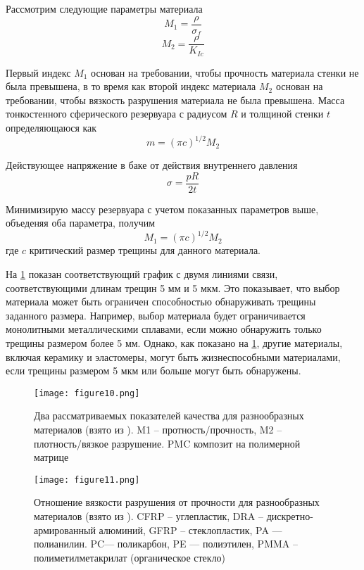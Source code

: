 Рассмотрим следующие параметры материала 
\[ M_1 = \frac{\rho}{\sigma_f} \]
\[ M_2 = \frac{\rho}{K_{Ic}} \]

Первый индекс \(M_1\) основан на требовании, чтобы прочность материала стенки не была превышена, в то время как второй индекс материала \(M_2\) основан на требовании, чтобы вязкость разрушения материала не была превышена. Масса тонкостенного сферического резервуара с радиусом \(R\) и толщиной стенки \(t\) определяющаюся как
\[ m = \left (\pi c \right)^{1/2} M_2 \]

Действующее напряжение в баке от действия внутреннего давления
\[ \sigma = \frac{p R}{2 t}\]

Минимизирую массу резервуара с учетом показанных параметров выше, объеденяя оба параметра, получим
\[ M_1 = \left ( \pi c \right ) ^{1/2} M_2\]
где \(c\) критический размер трещины для данного материала.

На \cref{fig:figure10} показан соответствующий график с двумя линиями связи, соответствующими длинам трещин 5 мм и 5 мкм. Это показывает, что выбор материала может быть ограничен способностью обнаруживать трещины заданного размера. Например, выбор материала будет ограничивается монолитными металлическими сплавами, если можно обнаружить только трещины размером более 5 мм. Однако, как показано на \cref{fig:figure10}, другие материалы, включая керамику и эластомеры, могут быть жизнеспособными материалами, если трещины размером 5 мкм
или больше могут быть обнаружены.

\begin{figure}[h!]
\centering
\texttt{[image: figure10.png]}%
\caption{Два рассматриваемых показателей качества для разнообразных материалов  (взято из \cite{ashby2005}). M1 -- протность/прочность, M2 -- плотность/вязкое разрушение. PMC композит на полимерной матрице}
\label{fig:figure10}
\end{figure}

\begin{figure}[h!]
\centering
\texttt{[image: figure11.png]}%
\caption{Отношение вязкости разрушения от прочности для разнообразных материалов  (взято из \cite{ashby2005}). CFRP -- углепластик, DRA -- дискретно-армированный алюминий, GFRP -- стеклопластик, PA --- полианилин. PC--- поликарбон, PE --- полиэтилен, PMMA -- полиметилметакрилат (органическое стекло)}
\label{fig:figure11}
\end{figure}


